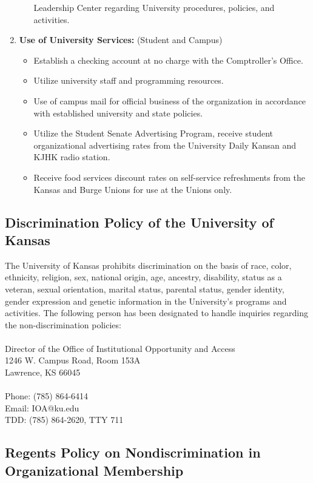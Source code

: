 \begin{enumerate}
\begin{itemize}
          Leadership Center regarding University procedures, policies, and
          activities.
  \end{itemize}
  \item \textbf{Use of University Services:} (Student and Campus)
  \begin{itemize}
    \item Establish a checking account at no charge with the Comptroller's
          Office.
    \item Utilize university staff and programming resources.
    \item Use of campus mail for official business of the organization in
          accordance with established university and state policies.
    \item Utilize the Student Senate Advertising Program, receive student
          organizational advertising rates from the University Daily Kansan and
          KJHK radio station.
    \item Receive food services discount rates on self-service refreshments from
          the Kansas and Burge Unions for use at the Unions only.
  \end{itemize}
\end{enumerate}


\subsection{Discrimination Policy of the University of Kansas}

The University of Kansas prohibits discrimination on the basis of race, color,
ethnicity, religion, sex, national origin, age, ancestry, disability, status as
a veteran, sexual orientation, marital status, parental status, gender identity,
gender expression and genetic information in the University\rq s programs and
activities. The following person has been designated to handle inquiries
regarding the non-discrimination policies:
\\
\\
Director of the Office of Institutional Opportunity and Access\\
1246 W. Campus Road, Room 153A\\
Lawrence, KS 66045\\
\\
Phone: (785) 864-6414\\
Email: IOA@ku.edu\\
TDD: (785) 864-2620, TTY 711

\subsection{Regents Policy on Nondiscrimination in Organizational Membership}

